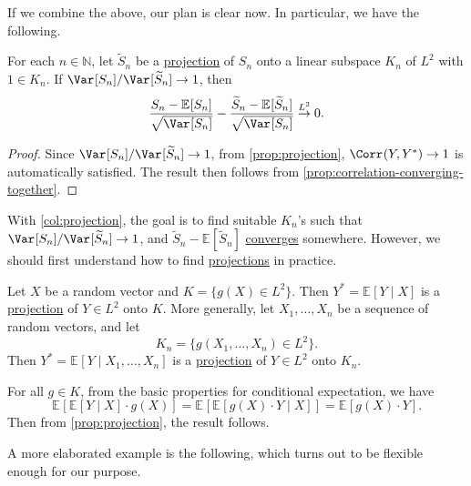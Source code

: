 If we combine the above, our plan is clear now. In particular, we have the following.

\begin{corollary}\label{col:projection}
	For each \(n \in \mathbb{N} \), let \(\widetilde{S} _n\) be a \hyperref[def:projection]{projection} of \(S_n\) onto a linear subspace \(K_n\) of \(L^2\) with \(1 \in K_n\). If \(\Var_{}[S_n] / \Var_{}[\widetilde{S} _n] \to 1\), then
	\[
		\frac{S_n - \mathbb{E}_{}[S_n] }{\sqrt{\Var_{}[S_n] } } - \frac{\widetilde{S} _n - \mathbb{E}_{}[\widetilde{S} _n] }{\sqrt{\Var_{}[S_n] } }
		\overset{L^2}{\to} 0.
	\]
\end{corollary}
\begin{proof}
	Since \(\Var_{}[S_n] / \Var_{}[\widetilde{S} _n] \to 1\), from \autoref{prop:projection}, \(\Corr_{}(Y, Y^{\ast} ) \to 1\) is automatically satisfied. The result then follows from \autoref{prop:correlation-converging-together}.
\end{proof}

With \autoref{col:projection}, the goal is to find suitable \(K_n\)'s such that \(\Var_{}[S_n] / \Var_{}[\widetilde{S} _n] \to 1\), and \(\widetilde{S} _n - \mathbb{E}_{}[\widetilde{S} _n] \) \hyperref[def:converge-in-distribution]{converges} somewhere. However, we should first understand how to find \hyperref[def:projection]{projections} in practice.

\begin{eg}
	Let \(X\) be a random vector and \(K = \{g(X) \in L^2 \} \). Then \(Y^{\ast} = \mathbb{E}_{}[Y \mid X] \) is a \hyperref[def:projection]{projection} of \(Y \in L^2\) onto \(K\). More generally, let \(X_1, \dots , X_n\) be a sequence of random vectors, and let
	\[
		K_n = \{g(X_1, \dots , X_n) \in L^2\}.
	\]
	Then \(Y^{\ast} = \mathbb{E}_{}[Y \mid X_1, \dots , X_n] \) is a \hyperref[def:projection]{projection} of \(Y \in L^2\) onto \(K_n\).
\end{eg}
\begin{explanation}
	For all \(g \in K\), from the basic properties for conditional expectation, we have
	\[
		\mathbb{E}_{}[\mathbb{E}_{}[Y \mid X] \cdot g(X)]
		= \mathbb{E}_{}[\mathbb{E}_{}[g(X) \cdot Y \mid X] ]
		= \mathbb{E}_{}[g(X) \cdot Y].
	\]
	Then from \autoref{prop:projection}, the result follows.
\end{explanation}

A more elaborated example is the following, which turns out to be flexible enough for our purpose.

